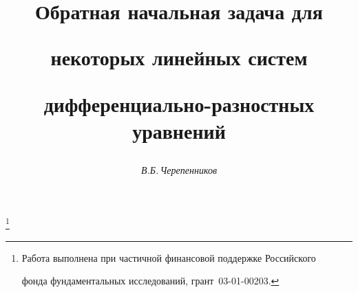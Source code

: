 








\newcommand{\rank}{\operatorname{rank}}


\newcommand{\tts}[1]{}







\setcounter{page}{59}















\author{\it В.Б.\,Черепенников}




\title{Обратная начальная задача для


некоторых линейных систем


дифференциально-разностных уравнений}


\thanks{Работа выполнена при частичной финансовой поддержке Российского


фонда фундаментальных исследований, грант \No\,03-01-00203.}





\date{}




\pagestyle{plain} %







\maketitle


